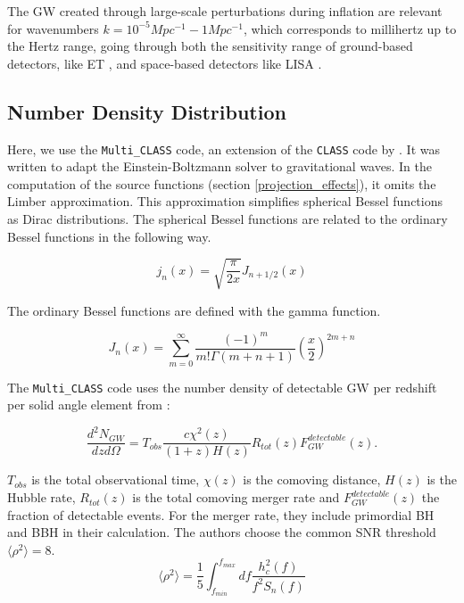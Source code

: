The GW created through large-scale perturbations during inflation are relevant for wavenumbers $k=10^{-5} Mpc^{-1} -1 Mpc^{-1}$, which corresponds to millihertz up to the Hertz range, going through both the sensitivity range of ground-based detectors, like ET \cite{alonso_noise_2020}, and space-based detectors like LISA \cite{robson_construction_2019}.


\subsection{Number Density Distribution}

Here, we use the {\tt Multi\_CLASS} code, an extension of the {\tt CLASS} code by \cite{bellomo_beware_2020}. It was written to adapt the Einstein-Boltzmann solver to gravitational waves. In the computation of the source functions (section \ref{projection_effects}), it omits the Limber approximation. This approximation simplifies spherical Bessel functions as Dirac distributions. The spherical Bessel functions are related to the ordinary Bessel functions in the following way.

\begin{equation}
    j_n(x)=\sqrt{\frac{\pi}{2x}}J_{n+1/2}(x)
\end{equation}

The ordinary Bessel functions are defined with the gamma function.

\begin{equation}
    J_n(x)=\sum_{m=0}^\infty \frac{(-1)^m}{m!\Gamma(m+n+1)}\left(\frac{x}{2}\right)^{2m+n}
\end{equation}

The {\tt Multi\_CLASS} code uses the number density of detectable GW per redshift per solid angle element from \cite{scelfo_gwtimeslss_2018}:

\begin{equation}
    \frac{d^2N_{GW}}{dzd\Omega} = T_{obs}\frac{c\chi^2(z)}{(1+z)H(z)}R_{tot}(z)F_{GW}^{detectable}(z).
\end{equation}

$T_{obs}$ is the total observational time, $\chi(z)$ is the comoving distance, $H(z)$ is the Hubble rate, $R_{tot}(z)$ is the total comoving merger rate and $F_{GW}^{detectable}(z)$ the fraction of detectable events. For the merger rate, they include primordial BH and BBH in their calculation.
The authors choose the common SNR threshold $\langle \rho^2 \rangle =8$.
\begin{equation}
    \langle \rho^2 \rangle = \frac{1}{5}\int_{f_{min}}^{f_{max}} df \frac{h_c^2(f)}{f^2 S_n(f)}
\end{equation}

